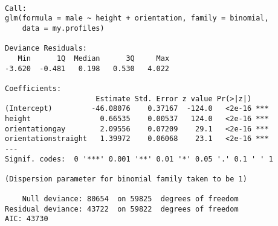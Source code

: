 \documentclass{beamer}\usepackage[]{graphicx}\usepackage[]{color}
\makeatletter
\newcommand{\hlopt}[1]{\textcolor[rgb]{1,0.894,0.769}{#1}}%
\newcommand{\hlstd}[1]{\textcolor[rgb]{1,0.894,0.769}{#1}}%
\newcommand{\hlkwb}[1]{\textcolor[rgb]{0.804,0.776,0.451}{#1}}%
\newcommand{\hlkwc}[1]{\textcolor[rgb]{0.78,0.941,0.545}{#1}}%
\newcommand{\hlkwd}[1]{\textcolor[rgb]{1,0.78,0.769}{#1}}%
\newenvironment{kframe}{%
 \def\at@end@of@kframe{}%
 \ifinner\ifhmode%
  \def\at@end@of@kframe{\end{minipage}}%
  \begin{minipage}{\columnwidth}%
 \fi\fi%
 \def\FrameCommand##1{\hskip\@totalleftmargin \hskip-\fboxsep
 \colorbox{shadecolor}{##1}\hskip-\fboxsep
     \hskip-\linewidth \hskip-\@totalleftmargin \hskip\columnwidth}%
 \MakeFramed {\advance\hsize-\width
   \@totalleftmargin\z@ \linewidth\hsize
   \@setminipage}}%
 {\par\unskip\endMakeFramed%
 \at@end@of@kframe}
\newenvironment{knitrout}{}{} %
\makeatother
\begin{document}
\begin{darkframes}

    \begin{frame}[fragile]
      \fontvsm\vspace{-0.3cm}
\begin{knitrout}
\begin{kframe}
\begin{verbatim}

Call:
glm(formula = male ~ height + orientation, family = binomial, 
    data = my.profiles)

Deviance Residuals: 
   Min      1Q  Median      3Q     Max  
-3.620  -0.481   0.198   0.530   4.022  

Coefficients:
                     Estimate Std. Error z value Pr(>|z|)    
(Intercept)         -46.08076    0.37167  -124.0   <2e-16 ***
height                0.66535    0.00537   124.0   <2e-16 ***
orientationgay        2.09556    0.07209    29.1   <2e-16 ***
orientationstraight   1.39972    0.06068    23.1   <2e-16 ***
---
Signif. codes:  0 '***' 0.001 '**' 0.01 '*' 0.05 '.' 0.1 ' ' 1

(Dispersion parameter for binomial family taken to be 1)

    Null deviance: 80654  on 59825  degrees of freedom
Residual deviance: 43722  on 59822  degrees of freedom
AIC: 43730


\end{verbatim}
\end{kframe}
\end{knitrout}
\end{frame}
\end{darkframes}
\end{document}
